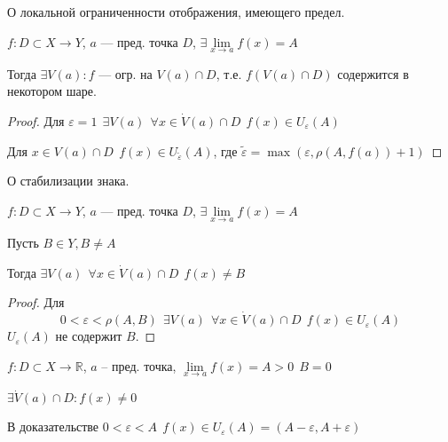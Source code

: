 \begin{theorem}
    О локальной ограниченности отображения, имеющего предел.

    $f: D\subset X\to Y$, $a$ --- пред. точка $D$, $\exists\lim\limits_{x\to a} f(x)=A$

    Тогда $\exists V(a) : f$ --- огр. на $V(a)\cap D$, т.е. $f(V(a)\cap D)$ содержится в некотором шаре.
\end{theorem}
\begin{proof}
    Для $\varepsilon = 1 \ \ \exists V(a) \ \ \forall x\in \dot V(a)\cap D \ \ f(x)\in U_\varepsilon(A)$

    Для $x\in V(a)\cap D \ \ f(x)\in U_{\tilde{\varepsilon}} (A)$, где $\tilde \varepsilon = \max(\varepsilon, \rho(A, f(a)) + 1)$
\end{proof}

\begin{theorem}
    О стабилизации знака.

    $f: D\subset X\to Y$, $a$ --- пред. точка $D$, $\exists\lim\limits_{x\to a} f(x)=A$

    Пусть $B\in Y, B\not=A$

    Тогда $\exists V(a) \ \ \forall x \in \dot V(a)\cap D \ \ f(x)\not = B$
\end{theorem}
\begin{proof}
    Для $$0 < \varepsilon < \rho(A, B) \ \ \exists V(a) \ \ \forall x\in \dot V(a)\cap D \ \ f(x)\in U_\varepsilon(A)$$ $U_\varepsilon(A)$ не содержит $B$.
\end{proof}
\begin{consequence} 
    $f:D\subset X \to \mathbb{R}$, $a$ -- пред. точка, $\lim\limits_{x\to a} f(x)=A>0 \ \ B=0$

    $\exists \dot V(a)\cap D : f(x)\not=0$

    В доказательстве $0<\varepsilon<A \ \ f(x)\in U_\varepsilon (A)=(A-\varepsilon, A+\varepsilon)$
\end{consequence}

